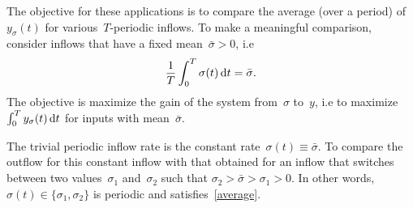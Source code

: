 The objective for these applications is to compare the average (over a period) of~$y_\sigma(t)$ for various~$T$-periodic inflows. 
To make  a meaningful comparison, consider inflows that have a fixed mean~$\bar \sigma>0$, i.e 
\begin{equation}\label{average}
	\frac 1T \int_0^T \sigma(t) \mathop{}\!\mathrm{d} t
	= \bar \sigma.
\end{equation}
The objective is maximize the gain of the system from~$\sigma$ to~$y$, i.e to maximize~$\int_0^T y_\sigma(t) \mathop{}\!\mathrm{d} t $ for inputs with mean~$\bar \sigma$.

The trivial periodic inflow rate is the constant rate~$\sigma(t)\equiv \bar \sigma$. 
To compare the outflow  for this constant inflow with that obtained for an inflow that switches  between two values~$\sigma_1$ and~$\sigma_2$ such that $\sigma_2>\bar \sigma >\sigma_1>0$.
In other words,  $\sigma(t)\in \{\sigma_1,\sigma_2\}$ is periodic and satisfies~\eqref{average}.  

